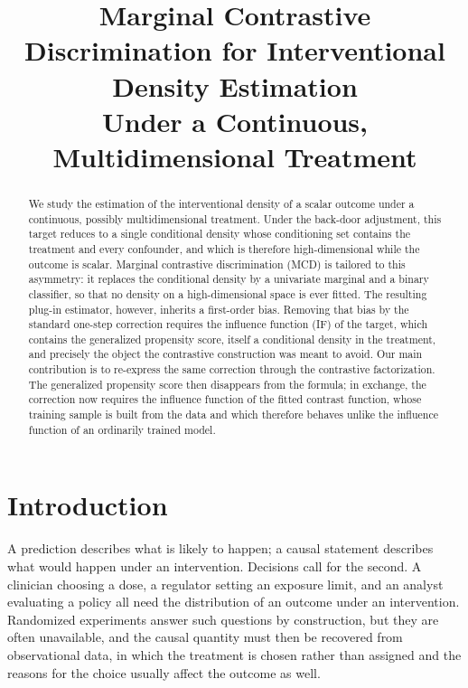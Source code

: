 \documentclass[11pt]{article}
\title{Marginal Contrastive Discrimination for Interventional Density Estimation\\
Under a Continuous, Multidimensional Treatment}
\author{}
\date{}
\theoremstyle{plain}
\theoremstyle{definition}
\theoremstyle{remark}
\begin{document}
\maketitle

\begin{abstract}
We study the estimation of the interventional density of a scalar outcome under a
continuous, possibly multidimensional treatment. Under the back-door adjustment, this
target reduces to a single conditional density whose conditioning set contains the
treatment and every confounder, and which is therefore high-dimensional while the outcome
is scalar. Marginal contrastive discrimination (MCD) is tailored to this asymmetry: it
replaces the conditional density by a univariate marginal and a binary classifier, so that no
density on a high-dimensional space is ever fitted. The resulting plug-in estimator,
however, inherits a first-order bias. Removing that bias by the standard one-step
correction requires the influence function (IF) of the target, which contains the generalized
propensity score, itself a conditional density in the treatment, and precisely the
object the contrastive construction was meant to avoid. Our main contribution is to
re-express the same correction through the contrastive factorization. The generalized
propensity score then disappears from the formula; in exchange, the correction now requires
the influence function of the fitted contrast function, whose training sample is built from
the data and which therefore behaves unlike the influence function of an ordinarily trained
model.
\end{abstract}

\section{Introduction}
\label{sec:intro}

A prediction describes what is likely to happen; a causal statement describes what would
happen under an intervention. Decisions call for the second. A clinician choosing a dose, a
regulator setting an exposure limit, and an analyst evaluating a policy all need the
distribution of an outcome under an intervention. Randomized experiments answer such
questions by construction, but they are often unavailable, and the causal quantity must then
be recovered from observational data, in which the treatment is chosen rather than assigned
and the reasons for the choice usually affect the outcome as well.
\end{document}
